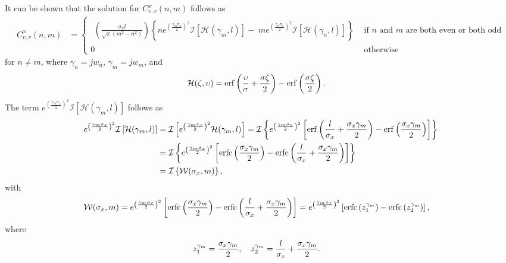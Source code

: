 \documentclass[a4paper,10pt]{article}
\DeclareMathOperator{\erf}{erf}
\DeclareMathOperator{\erfc}{erfc}
\begin{document}
It can be shown \cite{Alvarez:HeatEquationReport} that the solution
for $C^{x}_{v,v}(n,m)$ follows as
\begin{align}\label{eq:Cyqys_nm}
 C^{x}_{v,v}(n,m)&=
\begin{cases}
\begin{aligned}
\left(\frac{\sigma_x
l}{\sqrt{\pi}(m^2-n^2)}\right)\left\{ne^{\left(\frac{\gamma_m\sigma_x}{2}\right)^2}\mathcal{I}\left[\mathcal{H}
(\gamma_m,l)\right]-\;me^{\left(\frac{\gamma_n\sigma_x}{2}\right)^2}\mathcal{I}\left[\mathcal{H}(\gamma_n,l)\right]\right\}
\end{aligned}  & \mbox{if }n\mbox{ and }m\mbox{ are both even or both odd}\\
0&\mbox{otherwise}
\end{cases}
\end{align}
for $n\neq m$, where $\gamma_n=j w_n$, $\gamma_m=j w_m$, and  
\begin{align}
\notag \mathcal{H}(\zeta,\upsilon)&=\erf\left(\frac{\upsilon}{\sigma}+\frac{\sigma \zeta}{2}\right)-\erf\left(\frac{\sigma \zeta}{2}\right).
%
\end{align}
The term $e^{\left(\frac{\gamma_m\sigma_x}{2}\right)^2}\mathcal{I}\left[\mathcal{H}
(\gamma_m,l)\right]$ follows as
\begin{align}\notag
e^{\left(\frac{\gamma_m\sigma_x}{2}\right)^2}\mathcal{I}\left[\mathcal{H}
(\gamma_m,l)\right]& = \mathcal{I}\left[e^{\left(\frac{\gamma_m\sigma_x}{2}\right)^2}\mathcal{H}
(\gamma_m,l)\right] = \mathcal{I}\left\{e^{\left(\frac{\gamma_m\sigma_x}{2}\right)^2}\left[\erf\left(\frac{l}{\sigma_x}+\frac{\sigma_x \gamma_m}{2}\right)-\erf\left(\frac{\sigma_x \gamma_m}{2}\right)\right]\right\}\\
%
\notag
&= \mathcal{I}\left\{e^{\left(\frac{\gamma_m\sigma_x}{2}\right)^2}\left[\erfc\left(\frac{\sigma_x \gamma_m}{2}\right)-\erfc\left(\frac{l}{\sigma_x}+\frac{\sigma_x \gamma_m}{2}\right)\right]\right\}\\
%
\notag
&= \mathcal{I}\left\{\mathcal{W}(\sigma_x, m)\right\},
\end{align}
with
\begin{align}\notag
\mathcal{W}(\sigma_x, m) 
&=
  e^{\left(\frac{\gamma_m\sigma_x}{2}\right)^2}\left[\erfc\left(\frac{\sigma_x
  \gamma_m}{2}\right)-\erfc\left(\frac{l}{\sigma_x}+\frac{\sigma_x
  \gamma_m}{2}\right)\right] =e^{\left(\frac{\gamma_m\sigma_x}{2}\right)^2}\left[\erfc\left(z_1^{\gamma_m}\right)-\erfc\left(z_2^{\gamma_m}\right)\right],
\end{align}
where 
\begin{align}\notag
z_1^{\gamma_m} & = \frac{\sigma_x \gamma_m}{2}, \quad z_2^{\gamma_m} = \frac{l}{\sigma_x}+\frac{\sigma_x \gamma_m}{2}.
\end{align}
\end{document}
